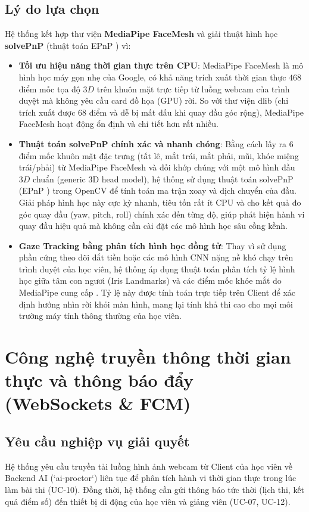 \documentclass[../DoAn.tex]{subfiles}
\begin{document}
\subsection{Lý do lựa chọn}
Hệ thống kết hợp thư viện \textbf{MediaPipe FaceMesh} \cite{Lugaresi2019MediaPipe} và giải thuật hình học \textbf{solvePnP} (thuật toán EPnP \cite{Lepetit2009EPnP}) vì:
\begin{itemize}
    \item \textbf{Tối ưu hiệu năng thời gian thực trên CPU}: MediaPipe FaceMesh \cite{Lugaresi2019MediaPipe} là mô hình học máy gọn nhẹ của Google, có khả năng trích xuất thời gian thực $468$ điểm mốc tọa độ $3D$ trên khuôn mặt trực tiếp từ luồng webcam của trình duyệt mà không yêu cầu card đồ họa (GPU) rời. So với thư viện dlib (chỉ trích xuất được 68 điểm và dễ bị mất dấu khi quay đầu góc rộng), MediaPipe FaceMesh hoạt động ổn định và chi tiết hơn rất nhiều.
    \item \textbf{Thuật toán solvePnP chính xác và nhanh chóng}: Bằng cách lấy ra $6$ điểm mốc khuôn mặt đặc trưng (tất lê, mắt trái, mắt phải, mũi, khóe miệng trái/phải) từ MediaPipe FaceMesh và đối khớp chúng với một mô hình đầu $3D$ chuẩn (generic 3D head model), hệ thống sử dụng thuật toán solvePnP (EPnP \cite{Lepetit2009EPnP}) trong OpenCV để tính toán ma trận xoay và dịch chuyển của đầu. Giải pháp hình học này cực kỳ nhanh, tiêu tốn rất ít CPU và cho kết quả đo góc quay đầu (yaw, pitch, roll) chính xác đến từng độ, giúp phát hiện hành vi quay đầu hiệu quả mà không cần cài đặt các mô hình học sâu cồng kềnh.
    \item \textbf{Gaze Tracking bằng phân tích hình học đồng tử}: Thay vì sử dụng phần cứng theo dõi đắt tiền hoặc các mô hình CNN nặng nề khó chạy trên trình duyệt của học viên, hệ thống áp dụng thuật toán phân tích tỷ lệ hình học giữa tâm con ngươi (Iris Landmarks) và các điểm mốc khóe mắt do MediaPipe cung cấp \cite{kaundinya2026inbrowser}. Tỷ lệ này được tính toán trực tiếp trên Client để xác định hướng nhìn rời khỏi màn hình, mang lại tính khả thi cao cho mọi môi trường máy tính thông thường của học viên.
\end{itemize}

\section{Công nghệ truyền thông thời gian thực và thông báo đẩy (WebSockets \& FCM)}
\label{section:3.6}

\subsection{Yêu cầu nghiệp vụ giải quyết}
Hệ thống yêu cầu truyền tải luồng hình ảnh webcam từ Client của học viên về Backend AI (`ai-proctor`) liên tục để phân tích hành vi thời gian thực trong lúc làm bài thi (UC-10). Đồng thời, hệ thống cần gửi thông báo tức thời (lịch thi, kết quả điểm số) đến thiết bị di động của học viên và giảng viên (UC-07, UC-12).
\end{document}
